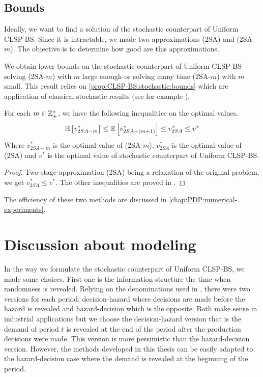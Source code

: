 


\subsection{Bounds}


Ideally, we want to find a solution of the stochastic counterpart of Uniform CLSP-BS.
Since it is intractable, we made two approximations (2SA) and (2SA-$m$).
The objective is to determine how good are this approximations.


We obtain lower bounds on the stochastic counterpart of Uniform CLSP-BS solving (2SA-$m$) with $m$ large enough or solving many time (2SA-$m$) with $m$ small.
This result relies on \cref{prop:CLSP-BS:stochastic:bounds} which are application of classical stochastic results (see for example \citet{Shapiro2009}).

\begin{prop}\label{prop:CLSP-BS:stochastic:bounds}
For each $m\in\mathbb{Z}_+^*$, we have the following inequalities on the optimal values.
\begin{equation}
  \espe\sqbracket{v^*_{2SA-m}}
  \le\espe\sqbracket{v^*_{2SA-(m+1)}}
  \le v^*_{2SA}
  \le v^*
\end{equation}
Where $v^*_{2SA-m}$ is the optimal value of (2SA-$m$), $v^*_{2SA}$ is the optimal value of (2SA) and $v^*$ is the optimal value of stochastic counterpart of Uniform CLSP-BS.
\end{prop}


\begin{proof}
Two-stage approximation (2SA) being a relaxation of the original problem, we get $v^*_{2SA} \le v^*$. The other inequalities are proved in \citet[Proposition 5.6]{Shapiro2009}.
\end{proof}


The efficiency of these two methods are discussed in \cref{chap:PDP:numerical-experiments}.



\section{Discussion about modeling}
\label{sec:stoch-CLSP-BS-discussion}

In the way we formulate the stochastic counterpart of Uniform CLSP-BS, we made some choices.
First one is the information structure \ie the time when randomness is revealed.
Relying on the denominations used in \citet{Carpentier2015}, there were two versions for each period: decision-hazard where decisions are made before the hazard is revealed and hazard-decision which is the opposite.
Both make sense in industrial applications but we choose the decision-hazard version that is the demand of period $t$ is revealed at the end of the period after the production decisions were made.
This version is more pessimistic than the hazard-decision version.
However, the methods developed in this thesis can be easily adapted to the hazard-decision case where the demand is revealed at the beginning of the period.


